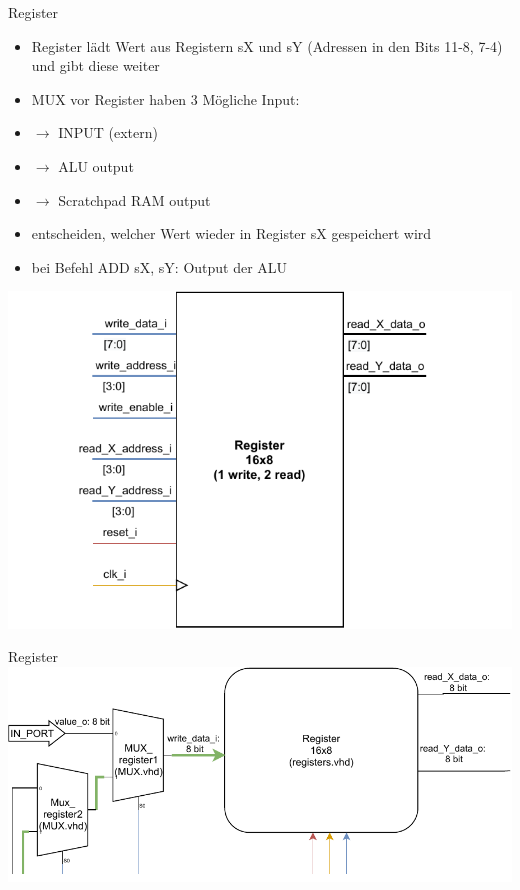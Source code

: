 \documentclass[10pt, t,
aspectratio=169,%
usenames,
dvipsnames,
]{beamer}
\begin{document}
	\begin{frame}{Register}
		\begin{multicols}{2}
		\begin{itemize}
			\item Register lädt Wert aus Registern sX und sY (Adressen in den Bits 11-8, 7-4) und gibt diese weiter
			\item MUX vor Register haben 3 Mögliche Input:
			\item $\rightarrow$ INPUT (extern)
			\item $\rightarrow$ ALU output
			\item $\rightarrow$ Scratchpad RAM output
			\item entscheiden, welcher Wert wieder in Register sX gespeichert wird
			\item bei Befehl ADD sX, sY: Output der ALU
		\end{itemize}
		\includegraphics[width=1.2\linewidth]{../Blockbeschreibungen/Register_beschreibung.pdf}
		\end{multicols}
	\end{frame}

	\begin{frame}{Register}
		\includegraphics[width=\linewidth]{../Blockbeschreibungen/Register-BlockdiagramSnipits2.pdf}
	\end{frame}
	
\end{document}
